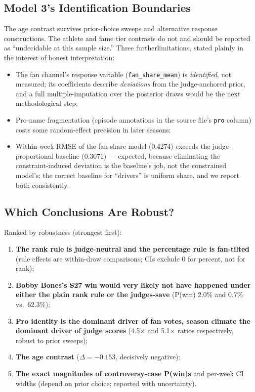 \documentclass{article}
\begin{document}
\subsection{Model 3's Identification Boundaries}

The age contrast survives prior-choice sweeps and alternative response constructions. The athlete and fame tier contrasts do not and should be reported as ``undecidable at this sample size.'' Three furtherlimitations, stated plainly in the interest of honest interpretation:
\begin{itemize}
  \item The fan channel's response variable (\texttt{fan\_share\_mean}) is \emph{identified}, not measured; its coefficients describe \emph{deviations} from the judge-anchored prior, and a full multiple-imputation over the posterior draws would be the next methodological step;
  \item Pro-name fragmentation (episode annotations in the source file's \texttt{pro} column) costs some random-effect precision in later seasons;
  \item Within-week RMSE of the fan-share model (0.4274) exceeds the judge-proportional baseline (0.3071) --- expected, because eliminating the constraint-induced deviation is the baseline's job, not the constrained model's; the correct baseline for ``drivers'' is uniform share, and we report both consistently.
\end{itemize}

\subsection{Which Conclusions Are Robust?}

Ranked by robustness (strongest first):
\begin{enumerate}
  \item \textbf{The rank rule is judge-neutral and the percentage rule is fan-tilted} (rule effects are within-draw comparisons; CIs exclude 0 for percent, not for rank);
  \item \textbf{Bobby Bones's S27 win would very likely not have happened under either the plain rank rule or the judges-save} (P(win) 2.0\% and 0.7\% vs.\ 62.3\%);
  \item \textbf{Pro identity is the dominant driver of fan votes, season climate the dominant driver of judge scores} (4.5$\times$ and 5.1$\times$ ratios respectively, robust to prior sweeps);
  \item \textbf{The age contrast} ($\Delta = -0.153$, decisively negative);
  \item \textbf{The exact magnitudes of controversy-case P(win)s} and per-week CI widths (depend on prior choice; reported with uncertainty).
\end{enumerate}
\end{document}
